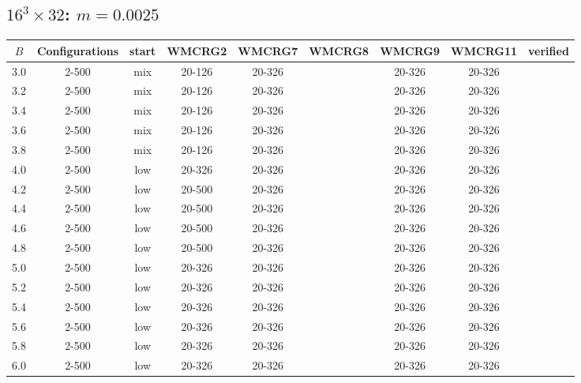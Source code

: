 \documentclass{article}
\begin{document}
\begin{center}
  \section*{$16^3\times32$:  $m=0.0025$}
    \begin{center}
    \begin{tabular}{| c | c | c | c | c | c | c | c | c |}
      \hline
      $B$ & Configurations & start & WMCRG2 & WMCRG7 & WMCRG8 & WMCRG9 & WMCRG11 & verified\\
      \hline
      3.0 & 2-500 & mix & 20-126 & 20-326 &  & 20-326 & 20-326 &\\ %
      3.2 & 2-500 & mix & 20-126 & 20-326 &  & 20-326 & 20-326 &\\
      3.4 & 2-500 & mix & 20-126 & 20-326 &  & 20-326 & 20-326 &\\
      3.6 & 2-500 & mix & 20-126 & 20-326 &  & 20-326 & 20-326 &\\
      3.8 & 2-500 & mix & 20-126 & 20-326 &  & 20-326 & 20-326 &\\ %
      4.0 & 2-500 & low & 20-326 & 20-326 &  & 20-326 & 20-326 &\\
      4.2 & 2-500 & low & 20-500 & 20-326 &  & 20-326 & 20-326 &\\
      4.4 & 2-500 & low & 20-500 & 20-326 &  & 20-326 & 20-326 &\\
      4.6 & 2-500 & low & 20-500 & 20-326 &  & 20-326 & 20-326 &\\
      4.8 & 2-500 & low & 20-500 & 20-326 &  & 20-326 & 20-326 &\\
      5.0 & 2-500 & low & 20-326 & 20-326 &  & 20-326 & 20-326 &\\
      5.2 & 2-500 & low & 20-326 & 20-326 &  & 20-326 & 20-326 &\\
      5.4 & 2-500 & low & 20-326 & 20-326 &  & 20-326 & 20-326 &\\
      5.6 & 2-500 & low & 20-326 & 20-326 &  & 20-326 & 20-326 &\\
      5.8 & 2-500 & low & 20-326 & 20-326 &  & 20-326 & 20-326 &\\ 
      6.0 & 2-500 & low & 20-326 & 20-326 &  & 20-326 & 20-326 &\\
      \hline
    \end{tabular}
    \end{center}

\end{center}
\end{document}
